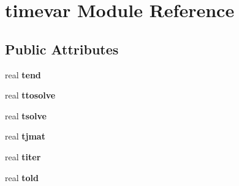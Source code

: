 \hypertarget{classtimevar}{\section{timevar Module Reference}
\label{classtimevar}
}
\subsection*{Public Attributes}
\begin{DoxyCompactItemize}
\item 
\hypertarget{classtimevar_a76d79f48bb04d878c1e66e9b09179181}{real {\bfseries tend}}\label{classtimevar_a76d79f48bb04d878c1e66e9b09179181}

\item 
\hypertarget{classtimevar_a154a69241e2e652b6a025650a2e903fe}{real {\bfseries ttosolve}}\label{classtimevar_a154a69241e2e652b6a025650a2e903fe}

\item 
\hypertarget{classtimevar_af710a2d90292754bfb0608b801729bc3}{real {\bfseries tsolve}}\label{classtimevar_af710a2d90292754bfb0608b801729bc3}

\item 
\hypertarget{classtimevar_ac142562bd2ebbe0b88a16b511c5a91d3}{real {\bfseries tjmat}}\label{classtimevar_ac142562bd2ebbe0b88a16b511c5a91d3}

\item 
\hypertarget{classtimevar_aa930b0267e96a826be5ba207aa8dae83}{real {\bfseries titer}}\label{classtimevar_aa930b0267e96a826be5ba207aa8dae83}

\item 
\hypertarget{classtimevar_af209975eea79e16faed013cf60c76a49}{real {\bfseries told}}\label{classtimevar_af209975eea79e16faed013cf60c76a49}

\end{DoxyCompactItemize}


